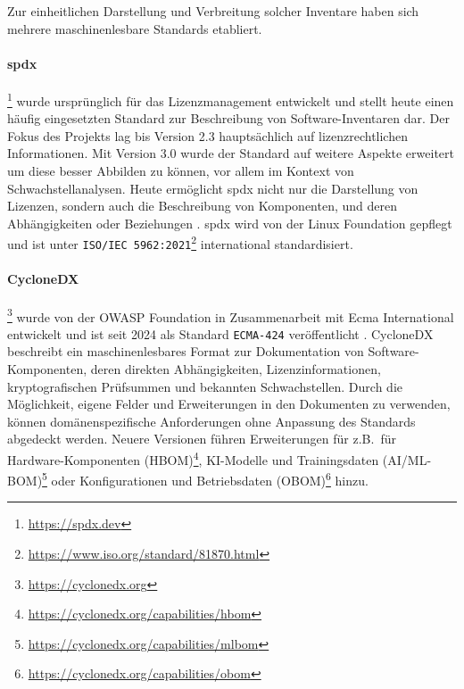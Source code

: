 Zur einheitlichen Darstellung und Verbreitung solcher Inventare haben sich mehrere maschinenlesbare Standards etabliert.


\paragraph{\acrfull{spdx}}\footnote{\url{https://spdx.dev}}
wurde ursprünglich für das Lizenzmanagement entwickelt und stellt heute einen häufig eingesetzten Standard zur Beschreibung von Software-Inventaren dar.
Der Fokus des Projekts lag bis Version 2.3 hauptsächlich auf lizenzrechtlichen Informationen.
Mit Version 3.0 wurde der Standard auf weitere Aspekte erweitert um diese besser Abbilden zu können, vor allem im Kontext von Schwachstellanalysen.
Heute ermöglicht \acrshort{spdx} nicht nur die Darstellung von Lizenzen, sondern auch die Beschreibung von Komponenten, und deren Abhängigkeiten oder Beziehungen \autocite{spdxOverview1june2024}.
\acrshort{spdx} wird von der Linux Foundation gepflegt und ist unter \texttt{ISO/IEC 5962:2021}\footnote{\url{https://www.iso.org/standard/81870.html}} international standardisiert.

\paragraph{CycloneDX}\footnote{\url{https://cyclonedx.org}}
wurde von der OWASP Foundation in Zusammenarbeit mit Ecma International entwickelt und ist seit 2024 als Standard \texttt{ECMA-424} veröffentlicht \autocite{CycloneDX2024Spec, ecma424:2024}.
CycloneDX beschreibt ein maschinenlesbares Format zur Dokumentation von Software-Komponenten, deren direkten Abhängigkeiten, Lizenzinformationen, kryptografischen Prüfsummen und bekannten Schwachstellen.
Durch die Möglichkeit, eigene Felder und Erweiterungen in den Dokumenten zu verwenden, können domänenspezifische Anforderungen ohne Anpassung des Standards abgedeckt werden.
Neuere Versionen führen Erweiterungen für z.B.\ für Hardware-Komponenten (HBOM)\footnote{\url{https://cyclonedx.org/capabilities/hbom}}, KI-Modelle und Trainingsdaten (AI/ML-BOM)\footnote{\url{https://cyclonedx.org/capabilities/mlbom}} oder Konfigurationen und Betriebsdaten (OBOM)\footnote{\url{https://cyclonedx.org/capabilities/obom}} hinzu.

